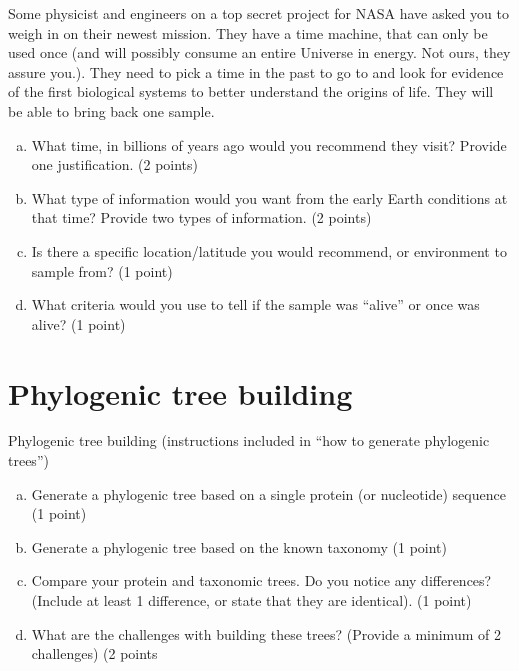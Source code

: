 \documentclass[]{article}
\begin{document}
Some physicist and engineers on a top secret project for NASA have asked you to weigh
in on their newest mission. They have a time machine, that can only be used once (and
will possibly consume an entire Universe in energy. Not ours, they assure you.). They
need to pick a time in the past to go to and look for evidence of the first biological
systems to better understand the origins of life. They will be able to bring back one
sample.
\begin{enumerate}[(a)]
	\item What time, in billions of years ago would you recommend they visit? Provide one
justification. (2 points)
	\item What type of information would you want from the early Earth conditions at that
time? Provide two types of information. (2 points)
	\item Is there a specific location/latitude you would recommend, or environment to sample
from? (1 point)
	\item What criteria would you use to tell if the sample was “alive” or once was alive? (1
point)
\end{enumerate}
\section{Phylogenic tree building}
Phylogenic tree building (instructions included in “how to generate phylogenic trees”)
\begin{enumerate}[(a)]
	\item Generate a phylogenic tree based on a single protein (or nucleotide) sequence (1
point)
	\item Generate a phylogenic tree based on the known taxonomy (1 point)
	\item Compare your protein and taxonomic trees. Do you notice any differences?
(Include at least 1 difference, or state that they are identical). (1 point)
	\item What are the challenges with building these trees? (Provide a minimum of 2
challenges) (2 points
\end{enumerate}


\printglossaries




\end{document}
